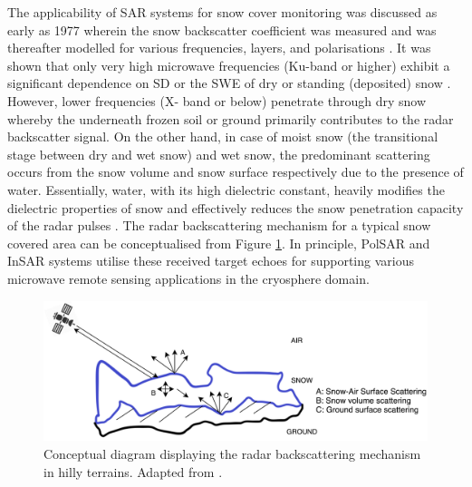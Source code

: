\documentclass[review]{elsarticle}
\numberwithin{equation}{section}
\numberwithin{figure}{section}
\numberwithin{table}{section}
\begin{document}
The applicability of SAR systems for snow cover monitoring was discussed as early as 1977 \citep{Ulaby1977} wherein the snow backscatter coefficient was measured and was thereafter modelled for various frequencies, layers, and polarisations \citep{Zuniga1979}. It was shown that only very high microwave frequencies (Ku-band or higher) exhibit a significant dependence on SD or the SWE of dry or standing (deposited) snow \citep{Yueh2009}. However, lower frequencies (X-
band or below) penetrate through dry snow whereby the underneath frozen soil or ground primarily contributes to the radar backscatter signal. On the other hand, in case of moist snow (the transitional stage between dry and wet snow) and wet snow, the predominant scattering occurs from the snow volume and snow surface respectively due to the presence of water. Essentially, water, with its high dielectric constant, heavily modifies the dielectric properties of snow and effectively reduces the snow penetration capacity of the radar pulses \citep{Abe1990}. The radar backscattering mechanism for a typical snow covered area can be conceptualised from Figure \ref{fig:concept}. In principle, PolSAR and InSAR systems utilise these received target echoes for supporting various microwave remote sensing applications in the cryosphere domain.

\begin{figure}[htb]
    \centering
    \includegraphics[width=\textwidth]{Figures/Conceptual.png}
    \caption{Conceptual diagram displaying the radar backscattering mechanism in hilly terrains. Adapted from \cite{Thakur2012}.}
    \label{fig:concept}
\end{figure}
\end{document}
